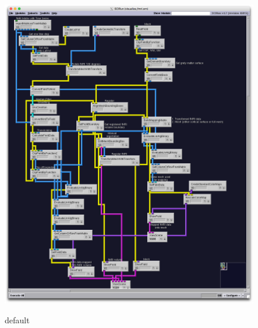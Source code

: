 \begin{figure}[p]
\begin{center}
\includegraphics[width=\textwidth]{Figures/fmri_network.png}\\
\caption{default}
\label{default}
\end{center}
\end{figure}

